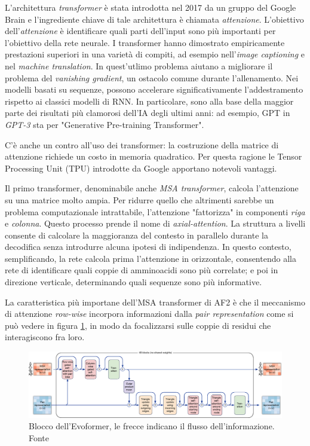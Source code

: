 \par L'architettura \textit{transformer} è stata introdotta nel 2017 da un gruppo del Google Brain\supercite{vaswani2017attention} e l'ingrediente chiave 
di tale architettura è chiamata \textit{attenzione}. L'obiettivo dell'\textit{attenzione} è identificare quali parti dell'input sono più importanti per l'obiettivo della rete neurale. I transformer hanno dimostrato empiricamente prestazioni superiori in una varietà di compiti, ad esempio nell'\textit{image captioning} e nel \textit{machine translation}. In quest'utlimo problema aiutano a migliorare il problema del \textit{vanishing gradient}, un ostacolo comune durante l'allenamento. Nei modelli basati su sequenze, possono accelerare significativamente l'addestramento rispetto ai classici modelli di RNN. In particolare, sono alla base della maggior parte dei risultati più clamorosi dell'IA degli ultimi anni: ad esempio, GPT in \textit{GPT-3} sta per "Generative Pre-training Transformer".

\par C'è anche un contro all'uso dei transformer: la costruzione della matrice di attenzione richiede un costo in memoria quadratico. Per questa ragione le Tensor Processing Unit (TPU) introdotte da Google apportano notevoli vantaggi.

\par Il primo transformer, denominabile anche \textit{MSA transformer}, calcola l'attenzione su una matrice molto ampia. Per ridurre quello che altrimenti sarebbe un problema computazionale intrattabile, l'attenzione "fattorizza" in componenti \textit{riga} e \textit{colonna}. Questo processo prende il nome di \textit{axial-attention}. La struttura a livelli consente di calcolare la maggioranza del contesto in parallelo durante la decodifica senza introdurre alcuna ipotesi di indipendenza. In questo contesto, semplificando, la rete calcola prima l'attenzione in orizzontale, consentendo alla rete di identificare quali coppie di amminoacidi sono più correlate; e poi in direzione verticale, determinando quali sequenze sono più informative. 

\par La caratteristica più importane dell'MSA transformer di AF2 è che il meccanismo di attenzione \textit{row-wise} incorpora informazioni dalla \textit{pair representation} come si può vedere in figura \ref{fig:evoformer}, in modo da focalizzarsi sulle coppie di residui che interagiscono fra loro.

\begin{figure}[!htb]
	\centering
	\includegraphics[scale=0.36]{images/evoformer.png}
	\caption{Blocco dell'Evoformer, le frecce indicano il flusso dell'informazione. Fonte\cite{jumper2021highly}}
	\label{fig:evoformer}
\end{figure}

